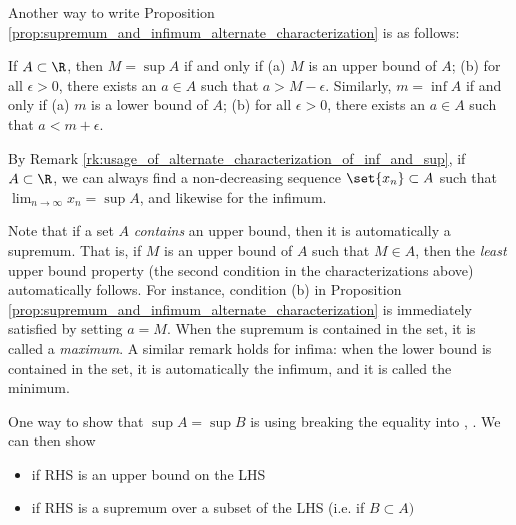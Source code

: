 \documentclass{article} %
\begin{document}
\begin{remark}
Another way to write Proposition \ref{prop:supremum_and_infimum_alternate_characterization} is as follows:	

If $A \subset \R$, then $M = \sup A$ if and only if (a) $M$ is an upper bound of $A$; (b) for all $\epsilon >0$, there exists an $a \in A$ such that $a>M-\epsilon$.  Similarly, $m = \inf A$ if and only if (a) $m$ is a lower bound of $A$; (b) for all $\epsilon >0$, there exists an $a \in A$ such that $a<m+\epsilon$.
\label{rk:usage_of_alternate_characterization_of_inf_and_sup}
\end{remark}

\begin{remark}{}
By Remark \ref{rk:usage_of_alternate_characterization_of_inf_and_sup}, if $A \subset \R$, we can always find a non-decreasing sequence $\set{x_n} \subset A$ such that $\lim_{n \to \infty} x_n = \sup A$, and likewise for the infimum.  
\label{rk:existence_of_sequences_converging_to_infimum_and_supremum}
\end{remark}

\begin{remark}{}
Note that if a set $A$ \textit{contains} an upper bound, then it is automatically a supremum.  That is, if $M$ is an upper bound of $A$ such that $M \in A$, then the \textit{least} upper bound property (the second condition in the characterizations above) automatically follows.  For instance, condition (b) in Proposition \ref{prop:supremum_and_infimum_alternate_characterization} is immediately satisfied by setting $a=M$.   When the supremum is contained in the set, it is called a \textit{maximum}.   A similar remark holds for infima: when the lower bound is contained in the set, it is automatically the infimum, and it is called the minimum.
\label{rk:when_upper_or_lower_bound_is_contained_in_the_set_itself} 
\end{remark}


\begin{remark}
One way to show that $\sup A = \sup B$ is using breaking the equality into \framebox{$\leq$}, \framebox{$\geq$}.  We can then show
\begin{itemize}
\item \framebox{$\leq$} if RHS is an upper bound on the LHS
\item \framebox{$\geq$} if RHS is a supremum over a subset of the LHS (i.e. if $B \subset A)$	
\end{itemize}
\label{rk:one_way_to_show_two_supremums_are_equal}
\end{remark}
\end{document}
